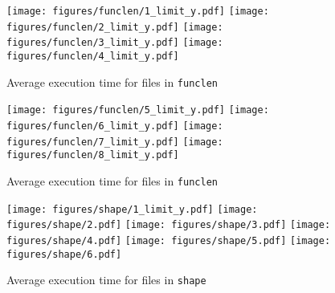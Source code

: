 \documentclass[12pt,dvipsnames]{article}
\newcommand{\mono}[1]{\texttt{#1}}
\begin{document}
\begin{figure}[ht]
    \centering
    \texttt{[image: figures/funclen/1\_limit\_y.pdf]}
    \texttt{[image: figures/funclen/2\_limit\_y.pdf]}
    \texttt{[image: figures/funclen/3\_limit\_y.pdf]}
    \texttt{[image: figures/funclen/4\_limit\_y.pdf]}
    \caption{Average execution time for files in \mono{funclen} }
    \label{fig:results_funclenc_a}
\end{figure}

\begin{figure}[ht]
    \centering
    \texttt{[image: figures/funclen/5\_limit\_y.pdf]}
    \texttt{[image: figures/funclen/6\_limit\_y.pdf]}
    \texttt{[image: figures/funclen/7\_limit\_y.pdf]}
    \texttt{[image: figures/funclen/8\_limit\_y.pdf]}
    \caption{Average execution time for files in \mono{funclen} }
    \label{fig:results_funclen_a}
\end{figure}

\begin{figure}[ht]
    \centering
    \texttt{[image: figures/shape/1\_limit\_y.pdf]}
    \texttt{[image: figures/shape/2.pdf]}
    \texttt{[image: figures/shape/3.pdf]}
    \texttt{[image: figures/shape/4.pdf]}
    \texttt{[image: figures/shape/5.pdf]}
    \texttt{[image: figures/shape/6.pdf]}
    \caption{Average execution time for files in \mono{shape} }
    \label{fig:results_shape}
\end{figure}
\end{document}
